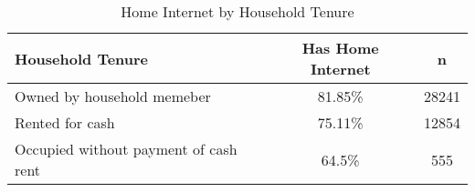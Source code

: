 \documentclass{article}
\begin{document}
\begin{table}[ht]
\centering
\begin{tabular}{lcc}
  \hline
  Household Tenure & Has Home Internet & n \\ 
  \hline
  Owned by household memeber & 81.85\% & 28241 \\ 
  Rented for cash & 75.11\% & 12854 \\ 
  Occupied without payment of cash rent & 64.5\% & 555 \\ 
   \hline
\end{tabular}
\caption*{Home Internet by Household Tenure} 
\end{table}
\end{document}
